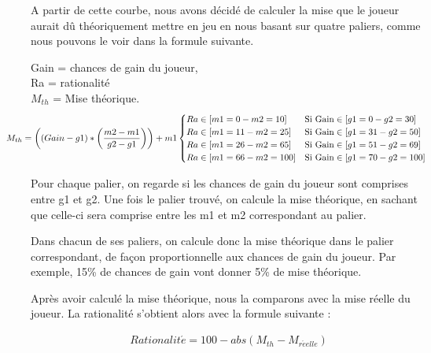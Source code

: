 \documentclass{report}
\begin{document}

A partir de cette courbe, nous avons décidé de calculer la mise que le joueur aurait dû théoriquement mettre en jeu en nous basant sur quatre paliers, comme nous pouvons le voir dans la formule suivante. \par

\small{
 	Gain = chances de gain du joueur,\\
Ra = rationalité\\
$M_{th}$ = Mise théorique.\\

\begin{align*}
	\hspace{-1cm}M_{th} = \left((Gain - g1) * \left(\frac{m2-m1}{g2-g1}\right)\right)+m1
	\begin{cases}
		Ra \in [m1=0 - m2=10] &\text{Si Gain} \in [g1=0 - g2=30]\\
		Ra \in [m1=11 - m2=25] &\text{Si Gain} \in [g1=31 - g2=50]\\
		Ra \in [m1=26 - m2=65] &\text{Si Gain} \in [g1=51 - g2=69]\\
		Ra \in [m1=66 - m2=100] &\text{Si Gain} \in [g1=70 - g2=100]\\
	\end{cases}
\end{align*}
}

Pour chaque palier, on regarde si les chances de gain du joueur sont comprises entre g1 et g2. Une fois le palier trouvé, on calcule la mise théorique, en sachant que celle-ci sera comprise entre les m1 et m2 correspondant au palier. \par
Dans chacun de ses paliers, on calcule donc la mise théorique dans le palier correspondant, de façon proportionnelle aux chances de gain du joueur. Par exemple, 15\% de chances de gain vont donner 5\% de mise théorique.\par
	
Après avoir calculé la mise théorique, nous la comparons avec la mise réelle du joueur. La rationalité s’obtient alors avec la formule suivante : \par

\begin{align*}
Rationalit\acute{e} = 100-abs(M_{th}-M_{r\acute{e}elle})
\end{align*}
\end{document}
